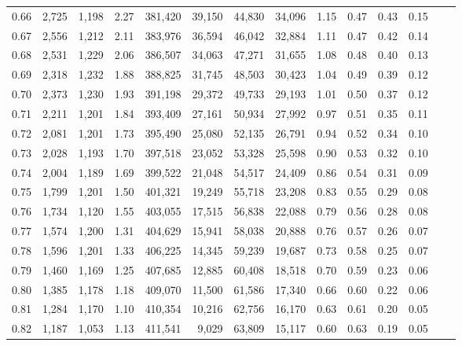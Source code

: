 \begin{tabular}{rrrrrrrrrrrrrr}
0.66 &  2,725 &  1,198 &    2.27 &  381,420 &   39,150 &  44,830 &  34,096 &  1.15 &  0.47 &  0.43 &      0.15 \\
0.67 &  2,556 &  1,212 &    2.11 &  383,976 &   36,594 &  46,042 &  32,884 &  1.11 &  0.47 &  0.42 &      0.14 \\
0.68 &  2,531 &  1,229 &    2.06 &  386,507 &   34,063 &  47,271 &  31,655 &  1.08 &  0.48 &  0.40 &      0.13 \\
0.69 &  2,318 &  1,232 &    1.88 &  388,825 &   31,745 &  48,503 &  30,423 &  1.04 &  0.49 &  0.39 &      0.12 \\
0.70 &  2,373 &  1,230 &    1.93 &  391,198 &   29,372 &  49,733 &  29,193 &  1.01 &  0.50 &  0.37 &      0.12 \\
0.71 &  2,211 &  1,201 &    1.84 &  393,409 &   27,161 &  50,934 &  27,992 &  0.97 &  0.51 &  0.35 &      0.11 \\
0.72 &  2,081 &  1,201 &    1.73 &  395,490 &   25,080 &  52,135 &  26,791 &  0.94 &  0.52 &  0.34 &      0.10 \\
0.73 &  2,028 &  1,193 &    1.70 &  397,518 &   23,052 &  53,328 &  25,598 &  0.90 &  0.53 &  0.32 &      0.10 \\
0.74 &  2,004 &  1,189 &    1.69 &  399,522 &   21,048 &  54,517 &  24,409 &  0.86 &  0.54 &  0.31 &      0.09 \\
0.75 &  1,799 &  1,201 &    1.50 &  401,321 &   19,249 &  55,718 &  23,208 &  0.83 &  0.55 &  0.29 &      0.08 \\
0.76 &  1,734 &  1,120 &    1.55 &  403,055 &   17,515 &  56,838 &  22,088 &  0.79 &  0.56 &  0.28 &      0.08 \\
0.77 &  1,574 &  1,200 &    1.31 &  404,629 &   15,941 &  58,038 &  20,888 &  0.76 &  0.57 &  0.26 &      0.07 \\
0.78 &  1,596 &  1,201 &    1.33 &  406,225 &   14,345 &  59,239 &  19,687 &  0.73 &  0.58 &  0.25 &      0.07 \\
0.79 &  1,460 &  1,169 &    1.25 &  407,685 &   12,885 &  60,408 &  18,518 &  0.70 &  0.59 &  0.23 &      0.06 \\
0.80 &  1,385 &  1,178 &    1.18 &  409,070 &   11,500 &  61,586 &  17,340 &  0.66 &  0.60 &  0.22 &      0.06 \\
0.81 &  1,284 &  1,170 &    1.10 &  410,354 &   10,216 &  62,756 &  16,170 &  0.63 &  0.61 &  0.20 &      0.05 \\
0.82 &  1,187 &  1,053 &    1.13 &  411,541 &    9,029 &  63,809 &  15,117 &  0.60 &  0.63 &  0.19 &      0.05 \\

\end{tabular}
